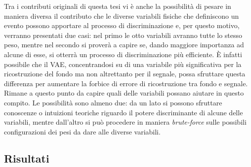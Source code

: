 Tra i contributi originali di questa tesi vi è anche la possibilità di pesare in maniera diversa il contributo che le diverse variabili fisiche che definiscono un evento possono apportare al processo di discriminazione e, per questo motivo, verranno presentati due casi: nel primo le otto variabili avranno tutte lo stesso peso, mentre nel secondo si proverà a capire se, dando maggiore importanza ad alcune di esse, si otterrà un processo di discriminazione più efficiente. È infatti possibile che il VAE, concentrandosi su di una variabile più significativa per la ricostruzione del fondo ma non altrettanto per il segnale, possa sfruttare questa differenza per aumentare la forbice di errore di ricostruzione tra fondo e segnale. Rimane a questo punto da capire quali delle variabili possano aiutare in questo compito. Le possibilità sono almeno due: da un lato si possono sfruttare conoscenze o intuizioni teoriche riguardo il potere discriminante di alcune delle variabili, mentre dall'altro si può procedere in maniera \textit{brute-force} sulle possibili configurazioni dei pesi da dare alle diverse variabili.\\


\newpage


\subsection{Risultati}
\label{risultati}

